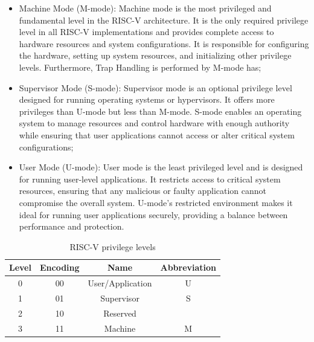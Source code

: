 \begin{itemize}
  \item Machine Mode (M-mode): Machine mode is the most privileged and
    fundamental level in the RISC-V architecture. It is the only required privilege
    level in all RISC-V implementations and provides complete access to hardware
    resources and system configurations. It is responsible for configuring the
    hardware, setting up system resources, and initializing other privilege
    levels. Furthermore, Trap Handling is performed by M-mode has;

  \item Supervisor Mode (S-mode): Supervisor mode is an optional privilege level
    designed for running operating systems or hypervisors. It offers more privileges
    than U-mode but less than M-mode. S-mode enables an operating system to
    manage resources and control hardware with enough authority while ensuring
    that user applications cannot access or alter critical system configurations;

  \item User Mode (U-mode): User mode is the least privileged level and is
    designed for running user-level applications. It restricts access to critical
    system resources, ensuring that any malicious or faulty application cannot
    compromise the overall system. U-mode’s restricted environment makes it ideal
    for running user applications securely, providing a balance between
    performance and protection.
\end{itemize}

\begin{table}
  \centering
  \begin{tabular}{|c|c|c|c|}
    \hline
    \textbf{Level} & \textbf{Encoding} & \textbf{Name}    & \textbf{Abbreviation} \\
    \hline
    0              & 00                & User/Application & U                     \\
    \hline
    1              & 01                & Supervisor       & S                     \\
    \hline
    2              & 10                & Reserved         &                       \\
    \hline
    3              & 11                & Machine          & M                     \\
    \hline
  \end{tabular}
  \caption{RISC-V privilege levels}
  \label{tab:priv}
\end{table}

